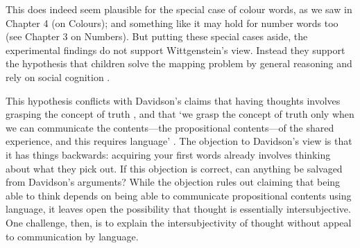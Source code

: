 \documentclass[12pt,\papersize]{extarticle}
\begin{document}
This does indeed seem plausible for the special case of colour words, as we saw in Chapter 4 (on Colours); 
and something like it may hold for number words too (see Chapter 3 on Numbers).  
But putting these special cases aside, the experimental findings do not support Wittgenstein's view.
Instead they support the hypothesis that children solve the mapping problem by general reasoning and rely on social cognition
\citep{Baldwin:1995xl,Bloom:2000qz,Sabbagh:2001sp}. 

This hypothesis conflicts with Davidson's claims that having thoughts involves grasping the concept of truth \citep[p.\ 189]{Davidson:2001sm}, 
and that `we grasp the concept of truth only when we can communicate the contents—the propositional contents—of the shared experience, and this requires language' \citep[p.\ 27]{Davidson:1997wj}.
%
The objection to Davidson's view is that  it has things backwards: acquiring your first words already involves thinking about what they pick out. 
If this objection is correct, can anything be salvaged from Davidson's arguments? 
While the objection rules out claiming that being able to think depends on being able to communicate propositional contents using language, it leaves open the possibility that thought is essentially intersubjective.
One challenge, then, is to explain the intersubjectivity of thought without appeal to communication by language.
\end{document}
